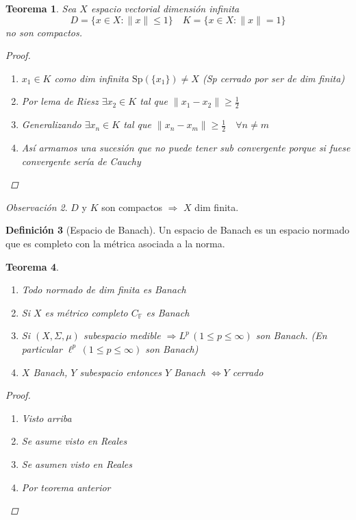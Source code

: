 \documentclass[12pt,a4paper]{article}
\newtheorem{theorem}{Teorema}[section]
\theoremstyle{definition}
\newtheorem{definition}[theorem]{Definición}
\theoremstyle{remark}
\newtheorem{remark}[theorem]{Observación}
\begin{document}
\begin{theorem}
Sea $X$ espacio vectorial dimensión infinita 
$$D=\{x \in X:\|x\| \leq 1\}\quad K=\{x \in X: \|x\| =1\}$$
no son compactos.
\begin{proof}
\begin{enumerate}
    \item $x_1\in K$ como dim infinita $\text{Sp}(\{x_1\})\neq X$ (Sp cerrado por ser de dim finita)
    \item Por lema de Riesz $\exists x_2\in K$ tal que $\|x_1-x_2\|\geq \frac{1}{2}$
    \item Generalizando $\exists x_n\in K$ tal que $\|x_n-x_m\|\geq \frac{1}{2}\quad\forall n\neq m$
    \item Así armamos una sucesión que no puede tener sub convergente porque si fuese convergente sería de Cauchy
\end{enumerate}
\end{proof}
\end{theorem}

\begin{remark}
$D$ y $K$ son compactos $\Rightarrow$ $X$ dim finita.
\end{remark}

\begin{definition}[Espacio de Banach]
Un espacio de Banach es un espacio normado que es completo con la métrica asociada a la norma.
\end{definition}

\begin{theorem}
\begin{enumerate}
    \item Todo normado de dim finita es Banach
    \item Si $X$ es métrico completo $C_{\mathbb{F}}$ es Banach
    \item Si $(X,\Sigma,\mu)$ subespacio medible $\Rightarrow L^p \,(1\leq p\leq \infty)$ son Banach. (En particular $\ell^p \,(1\leq p\leq \infty)$ son Banach)
    \item $X$ Banach, $Y$ subespacio entonces $Y$ Banach $\iff Y$ cerrado
\end{enumerate}
\begin{proof}
\begin{enumerate}
    \item Visto arriba
    \item Se asume visto en Reales
    \item Se asumen visto en Reales
    \item Por teorema anterior
\end{enumerate}
\end{proof}
\end{theorem}
\end{document}
